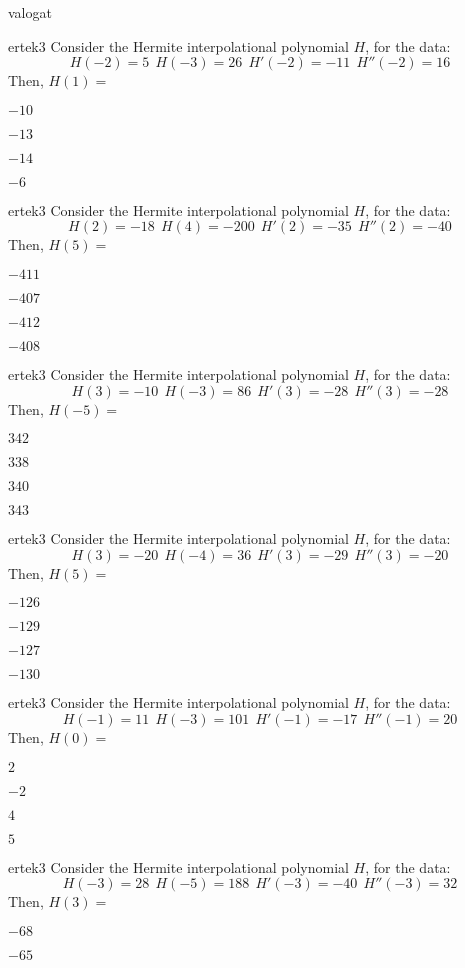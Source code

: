 \documentclass[12pt]{article}
\begin{document}
\begin{quiz}{valogat}
\begin{multi}{ertek3}
Consider the Hermite interpolational polynomial $H$, for the data:
$$
H(-2)=5 \ \ H(-3)=26 \ \ H'(-2)=-11 \ \ H''(-2)=16
$$
Then, $H(1)=$
\item* $ -10 $
\item  $ -13 $
\item  $ -14 $
\item  $ -6 $
\end{multi}\begin{multi}{ertek3}
Consider the Hermite interpolational polynomial $H$, for the data:
$$
H(2)=-18 \ \ H(4)=-200 \ \ H'(2)=-35 \ \ H''(2)=-40
$$
Then, $H(5)=$
\item* $ -411 $
\item  $ -407 $
\item  $ -412 $
\item  $ -408 $
\end{multi}\begin{multi}{ertek3}
Consider the Hermite interpolational polynomial $H$, for the data:
$$
H(3)=-10 \ \ H(-3)=86 \ \ H'(3)=-28 \ \ H''(3)=-28
$$
Then, $H(-5)=$
\item* $ 342 $
\item  $ 338 $
\item  $ 340 $
\item  $ 343 $
\end{multi}\begin{multi}{ertek3}
Consider the Hermite interpolational polynomial $H$, for the data:
$$
H(3)=-20 \ \ H(-4)=36 \ \ H'(3)=-29 \ \ H''(3)=-20
$$
Then, $H(5)=$
\item* $ -126 $
\item  $ -129 $
\item  $ -127 $
\item  $ -130 $
\end{multi}\begin{multi}{ertek3}
Consider the Hermite interpolational polynomial $H$, for the data:
$$
H(-1)=11 \ \ H(-3)=101 \ \ H'(-1)=-17 \ \ H''(-1)=20
$$
Then, $H(0)=$
\item* $ 2 $
\item  $ -2 $
\item  $ 4 $
\item  $ 5 $
\end{multi}\begin{multi}{ertek3}
Consider the Hermite interpolational polynomial $H$, for the data:
$$
H(-3)=28 \ \ H(-5)=188 \ \ H'(-3)=-40 \ \ H''(-3)=32
$$
Then, $H(3)=$
\item* $ -68 $
\item  $ -65 $

\end{multi}
\end{quiz}
\end{document}
